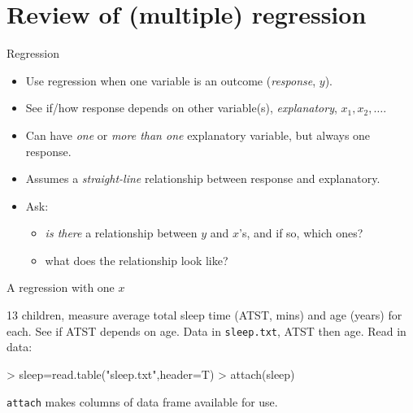 \documentclass{beamer}
\begin{document}



\section{Review of (multiple) regression}

\begin{frame}{Regression}

  \begin{itemize}
  \item Use regression when one variable is an outcome ({\em response}, $y$).
  \item See if/how response depends on other variable(s), {\em explanatory}, $x_1, x_2,\ldots$.
  \item Can have {\em one} or {\em more than one} explanatory variable, but always one response.
  \item Assumes a {\em straight-line} relationship between response and explanatory.
  \item Ask: 
    \begin{itemize}
    \item {\em is there} a relationship between $y$ and $x$'s, and if so, which ones?
    \item what does the relationship look like?
    \end{itemize}

  \end{itemize}
  
\end{frame}

\begin{frame}[fragile]{A regression with one $x$}

13 children, measure average total sleep time (ATST, mins) and age (years) for each. See if ATST depends on age. Data in \verb-sleep.txt-, ATST then age. Read in data:


\begin{Schunk}
\begin{Sinput}
> sleep=read.table("sleep.txt",header=T)
> attach(sleep)
\end{Sinput}
\end{Schunk}

\texttt{attach} makes columns of data frame available for use.

\end{frame}
\end{document}
